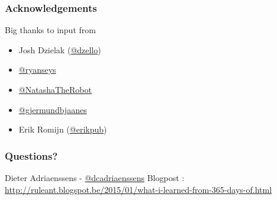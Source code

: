 \documentclass[14pt]{beamer}
\begin{document}
  \begin{frame}
    \frametitle{Acknowledgements}
    Big thanks to input from
    \begin{itemize}
      \item Josh Dzielak (\href{https://twitter.com/dzello}{@dzello})
      \item \href{https://twitter.com/ryanseys}{@ryanseys}
      \item \href{https://twitter.com/natashatherobot}{@NatashaTheRobot}
      \item \href{https://twitter.com/gjermundbjaanes}{@gjermundbjaanes}
      \item Erik Romijn (\href{https://twitter.com/erikpub}{@erikpub})
    \end{itemize}
  \end{frame}
  \begin{frame}
   \frametitle{Questions?}
    Dieter Adriaenssens - \href{https://twitter.com/dcadriaenssens}{\small{@dcadriaenssens}}
    \vfill
    Blogpost : \href{http://ruleant.blogspot.be/2015/01/what-i-learned-from-365-days-of.html}{http://ruleant.blogspot.be/2015/01/what-i-learned-from-365-days-of.html}
  \end{frame}
\end{document}
